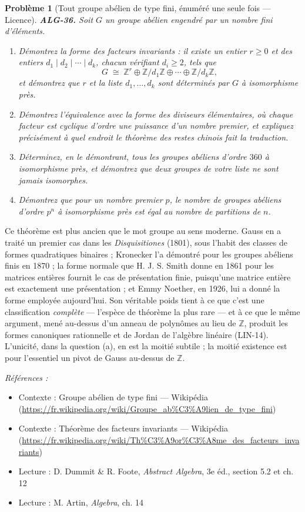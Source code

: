 \documentclass[11pt]{article}
\newtheorem{problem}{Problème}
\newenvironment{refs}{\par\small\noindent\emph{Références :}\begin{itemize}\setlength\itemsep{0pt}}{\end{itemize}\normalsize}
\begin{document}
\begin{problem}[{Tout groupe abélien de type fini, énuméré une seule fois --- Licence}]
\textbf{ALG-36.} Soit $G$ un groupe abélien engendré par un nombre fini d'éléments.
\begin{enumerate}
\item[(a)] Démontrez la forme des facteurs invariants : il existe un entier $r \ge 0$ et des entiers
$d_1 \mid d_2 \mid \cdots \mid d_k$, chacun vérifiant $d_i \ge 2$, tels que
\[ G \;\cong\; \mathbb{Z}^{r} \oplus \mathbb{Z}/d_1\mathbb{Z} \oplus \cdots \oplus \mathbb{Z}/d_k\mathbb{Z}, \]
et démontrez que $r$ et la liste $d_1, \dots, d_k$ sont déterminés par $G$ à isomorphisme près.
\item[(b)] Démontrez l'équivalence avec la forme des diviseurs élémentaires, où chaque facteur est cyclique
d'ordre une puissance d'un nombre premier, et expliquez précisément à quel endroit le théorème des restes
chinois fait la traduction.
\item[(c)] Déterminez, en le démontrant, tous les groupes abéliens d'ordre $360$ à isomorphisme près, et
démontrez que deux groupes de votre liste ne sont jamais isomorphes.
\item[(d)] Démontrez que pour un nombre premier $p$, le nombre de groupes abéliens d'ordre $p^n$ à
isomorphisme près est égal au nombre de partitions de $n$.
\end{enumerate}

\end{problem}

\noindent Ce théorème est plus ancien que le mot \og{} groupe \fg{} au sens moderne. Gauss en a traité un
premier cas dans les \textit{Disquisitiones} (1801), sous l'habit des classes de formes quadratiques binaires ;
Kronecker l'a démontré pour les groupes abéliens finis en 1870 ; la forme normale que H. J. S. Smith donne en
1861 pour les matrices entières fournit le cas de présentation finie, puisqu'une matrice entière est
exactement une présentation ; et Emmy Noether, en 1926, lui a donné la forme employée aujourd'hui. Son
véritable poids tient à ce que c'est une classification \textit{complète} --- l'espèce de théorème la plus rare ---
et à ce que le même argument, mené au-dessus d'un anneau de polynômes au lieu de $\mathbb{Z}$, produit les
formes canoniques rationnelle et de Jordan de l'algèbre linéaire (LIN-14). L'unicité, dans la question (a),
en est la moitié subtile ; la moitié existence est pour l'essentiel un pivot de Gauss au-dessus de
$\mathbb{Z}$.

\begin{refs}
\item Contexte : Groupe abélien de type fini --- Wikipédia (\url{https://fr.wikipedia.org/wiki/Groupe_ab%C3%A9lien_de_type_fini})
\item Contexte : Théorème des facteurs invariants --- Wikipédia (\url{https://fr.wikipedia.org/wiki/Th%C3%A9or%C3%A8me_des_facteurs_invariants})
\item Lecture : D. Dummit \& R. Foote, \textit{Abstract Algebra}, 3e éd., section 5.2 et ch. 12
\item Lecture : M. Artin, \textit{Algebra}, ch. 14
\end{refs}
\end{document}
